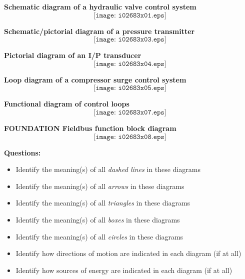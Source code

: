 \filbreak

\noindent
{\bf Schematic diagram of a hydraulic valve control system}
$$\texttt{[image: i02683x01.eps]}$$

\filbreak

\noindent
{\bf Schematic/pictorial diagram of a pressure transmitter}
$$\texttt{[image: i02683x03.eps]}$$

\filbreak

\noindent
{\bf Pictorial diagram of an I/P transducer}
$$\texttt{[image: i02683x04.eps]}$$

\filbreak

\noindent
{\bf Loop diagram of a compressor surge control system}
$$\texttt{[image: i02683x05.eps]}$$

\filbreak

\noindent
{\bf Functional diagram of control loops}
$$\texttt{[image: i02683x07.eps]}$$

\filbreak

\noindent
{\bf FOUNDATION Fieldbus function block diagram}
$$\texttt{[image: i02683x08.eps]}$$



\vskip 10pt

\noindent
{\bf Questions:}
\begin{itemize}
\item{} Identify the meaning(s) of all {\it dashed lines} in these diagrams 
\item{} Identify the meaning(s) of all {\it arrows} in these diagrams 
\item{} Identify the meaning(s) of all {\it triangles} in these diagrams 
\item{} Identify the meaning(s) of all {\it boxes} in these diagrams 
\item{} Identify the meaning(s) of all {\it circles} in these diagrams 
\item{} Identify how directions of motion are indicated in each diagram (if at all)
\item{} Identify how sources of energy are indicated in each diagram (if at all)
\end{itemize}





















